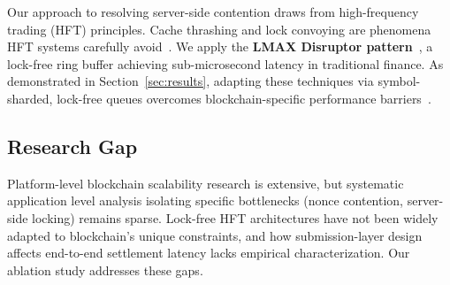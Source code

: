 Our approach to resolving server-side contention draws from high-frequency trading (HFT) principles. Cache thrashing and lock convoying are phenomena HFT systems carefully avoid~\cite{moir2018concurrent}. We apply the \textbf{LMAX Disruptor pattern}~\cite{thompson2011disruptor}, a lock-free ring buffer achieving sub-microsecond latency in traditional finance. As demonstrated in Section~\ref{sec:results}, adapting these techniques via symbol-sharded, lock-free queues overcomes blockchain-specific performance barriers~\cite{bilokon2023cpp,ng2018lockfree}.

\subsection{Research Gap}

Platform-level blockchain scalability research is extensive, but systematic application level analysis isolating specific bottlenecks (nonce contention, server-side locking) remains sparse. Lock-free HFT architectures have not been widely adapted to blockchain's unique constraints, and how submission-layer design affects end-to-end settlement latency lacks empirical characterization. Our ablation study addresses these gaps.

